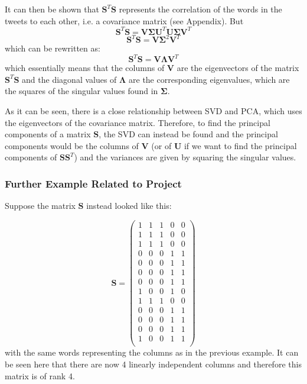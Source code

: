\documentclass[11pt,a4paper]{article}
\begin{document}
It can then be shown that $\mathbf{S}^T\mathbf{S}$ represents the correlation of the words in the tweets to each other, i.e. a covariance matrix (see Appendix). But 
\begin{equation*}
\mathbf{S}^T\mathbf{S} = \mathbf{V}\mathbf{\Sigma}\mathbf{U}^T  \mathbf{U}\mathbf{\Sigma}\mathbf{V}^T
\end{equation*}
\begin{equation}
\mathbf{S}^T\mathbf{S} = \mathbf{V}\mathbf{\Sigma}^2\mathbf{V}^T
\end{equation}
which can be rewritten as:
\begin{equation}
\mathbf{S}^T\mathbf{S} = \mathbf{V}\mathbf{\Lambda}\mathbf{V}^T
\end{equation}
which essentially means that the columns of $\mathbf{V}$ are the eigenvectors of the matrix $\mathbf{S}^T\mathbf{S}$ and the diagonal values of $\mathbf{\Lambda}$ are the corresponding eigenvalues, which are the squares of the singular values found in $\mathbf{\Sigma}$.

As it can be seen, there is a close relationship between SVD and PCA, which uses the eigenvectors of the covariance matrix. Therefore, to find the principal components of a matrix $\mathbf{S}$, the SVD can instead be found and the principal components would be the columns of $\mathbf{V}$ (or of $\mathbf{U}$ if we want to find the principal components of $\mathbf{S}\mathbf{S}^T$) and the variances are given by squaring the singular values.

\subsubsection{Further Example Related to Project}
Suppose the matrix $\mathbf{S}$ instead looked like this:

\begin{equation}
\mathbf{S} = 
\begin{pmatrix}
1 & 1 & 1 & 0 & 0\\
1 & 1 & 1 & 0 & 0\\
1 & 1 & 1 & 0 & 0\\
0 & 0 & 0 & 1 & 1\\
0 & 0 & 0 & 1 & 1\\
0 & 0 & 0 & 1 & 1\\
0 & 0 & 0 & 1 & 1\\
1 & 0 & 0 & 1 & 0\\
1 & 1 & 1 & 0 & 0\\
0 & 0 & 0 & 1 & 1\\
0 & 0 & 0 & 1 & 1\\
0 & 0 & 0 & 1 & 1\\
1 & 0 & 0 & 1 & 1\\
\end{pmatrix}
\end{equation}
with the same words representing the columns as in the previous example. It can be seen here that there are now 4 linearly independent columns and therefore this matrix is of rank 4. 
\end{document}
